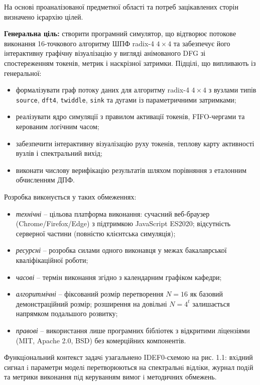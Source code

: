 \documentclass[
]{article}
\newcommand{\passthrough}[1]{#1}
\begin{document}
На основі проаналізованої предметної області та потреб зацікавлених
сторін визначено ієрархію цілей.

\textbf{Генеральна ціль:} створити програмний симулятор, що відтворює
потокове виконання 16-точкового алгоритму ШПФ radix-4 \(4 \times 4\) та
забезпечує його інтерактивну графічну візуалізацію у вигляді анімованого
DFG зі спостереженням токенів, метрик і наскрізної затримки. Підцілі, що
випливають із генеральної:

\begin{itemize}
\item
  формалізувати граф потоку даних для алгоритму radix-4 \(4 \times 4\) з
  вузлами типів \passthrough{\lstinline!source!},
  \passthrough{\lstinline!dft!}\passthrough{\lstinline!4!},
  \passthrough{\lstinline!twiddle!}, \passthrough{\lstinline!sink!} та
  дугами із параметричними затримками;
\item
  реалізувати ядро симуляції з правилом активації токенів, FIFO-чергами
  та керованим логічним часом;
\item
  забезпечити інтерактивну візуалізацію руху токенів, теплову карту
  активності вузлів і спектральний вихід;
\item
  виконати числову верифікацію результатів шляхом порівняння з еталонним
  обчисленням ДПФ.
\end{itemize}

Розробка виконується у таких обмеженнях:

\begin{itemize}
\item
  \emph{технічні} -- цільова платформа виконання: сучасний веб-браузер
  (Chrome/Firefox/Edge) з підтримкою JavaScript ES2020; відсутність
  серверної частини (повністю клієнтська симуляція);
\item
  \emph{ресурсні} -- розробка силами одного виконавця у межах
  бакалаврської кваліфікаційної роботи;
\item
  \emph{часові} -- термін виконання згідно з календарним графіком
  кафедри;
\item
  \emph{алгоритмічні} -- фіксований розмір перетворення \(N = 16\) як
  базовий демонстраційний розмір; розширення на довільні \(N = 4^{t}\)
  залишається напрямком подальшого розвитку;
\item
  \emph{правові} -- використання лише програмних бібліотек з відкритими
  ліцензіями (MIT, Apache 2.0, BSD) без комерційних компонентів.
\end{itemize}

Функцiональний контекст задачi узагальнено IDEF0-схемою на рис. 1.1:
вхiдний сигнал i параметри моделi перетворюються на спектральнi вiдлiки,
журнал подiй та метрики виконання пiд керуванням вимог i методичних
обмежень.
\end{document}
